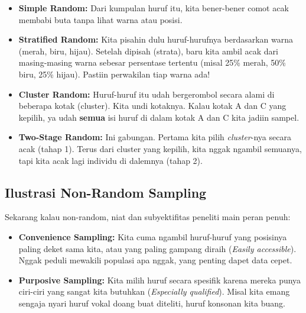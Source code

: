 \documentclass[12pt,a4paper]{article}
\begin{document}
\begin{itemize}
    \item \textbf{Simple Random:} Dari kumpulan huruf itu, kita bener-bener comot acak membabi buta tanpa lihat warna atau posisi.
    \item \textbf{Stratified Random:} Kita pisahin dulu huruf-hurufnya berdasarkan warna (merah, biru, hijau). Setelah dipisah (strata), baru kita ambil acak dari masing-masing warna sebesar persentase tertentu (misal 25\% merah, 50\% biru, 25\% hijau). Pastiin perwakilan tiap warna ada!
    \item \textbf{Cluster Random:} Huruf-huruf itu udah bergerombol secara alami di beberapa kotak (cluster). Kita undi kotaknya. Kalau kotak A dan C yang kepilih, ya udah \textbf{semua} isi huruf di dalam kotak A dan C kita jadiin sampel.
    \item \textbf{Two-Stage Random:} Ini gabungan. Pertama kita pilih \textit{cluster}-nya secara acak (tahap 1). Terus dari cluster yang kepilih, kita nggak ngambil semuanya, tapi kita acak lagi individu di dalemnya (tahap 2).
\end{itemize}

\subsection{Ilustrasi Non-Random Sampling}
Sekarang kalau non-random, niat dan subyektifitas peneliti main peran penuh:

\begin{itemize}
    \item \textbf{Convenience Sampling:} Kita cuma ngambil huruf-huruf yang posisinya paling deket sama kita, atau yang paling gampang diraih (\textit{Easily accessible}). Nggak peduli mewakili populasi apa nggak, yang penting dapet data cepet.
    \item \textbf{Purposive Sampling:} Kita milih huruf secara spesifik karena mereka punya ciri-ciri yang sangat kita butuhkan (\textit{Especially qualified}). Misal kita emang sengaja nyari huruf vokal doang buat diteliti, huruf konsonan kita buang.
\end{itemize}
\end{document}
